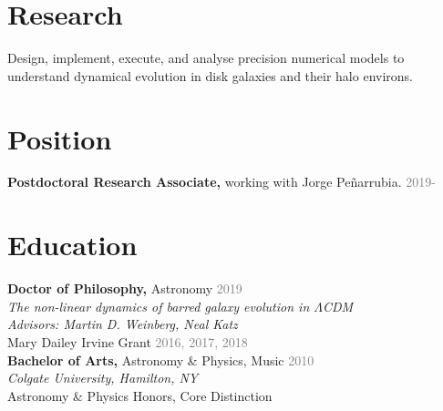 \documentclass[margin, 11pt]{res} %
\begin{document}
\begin{resume}

\section{\sc \textcolor{redshade}{Research} }

Design, implement, execute, and analyse precision numerical models to understand dynamical evolution in disk galaxies and their halo environs.


\section{\sc \textcolor{redshade}{Position}}

{\bf Postdoctoral Research Associate,} working with Jorge Pe{\~n}arrubia. \hfill \textcolor{grey}{2019-}

\section{\sc \textcolor{redshade}{Education}}

{\bf Doctor of Philosophy,} Astronomy \hfill \textcolor{grey}{2019}\\
\hspace*{0.25 in} {\sl \textcolor{blueshade}{The non-linear dynamics of barred galaxy evolution in $\Lambda$CDM}}\\
\hspace*{0.25 in} {\sl Advisors: Martin D. Weinberg, Neal Katz}\\
\hspace*{0.4 in} Mary Dailey Irvine Grant \hfill \textcolor{grey}{2016, 2017, 2018}\\
{\bf Bachelor of Arts,} Astronomy \& Physics, Music \hfill \textcolor{grey}{2010}\\
\hspace*{0.25 in} {\sl Colgate University, Hamilton, NY}\\
\hspace*{0.4 in} Astronomy \& Physics Honors, Core Distinction



\end{resume}
\end{document}
